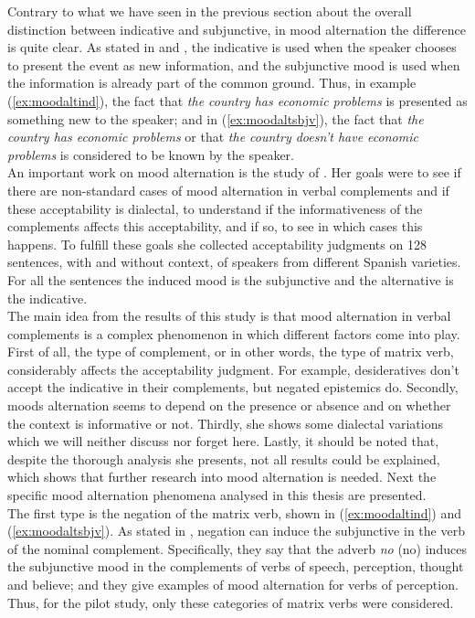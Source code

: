 Contrary to what we have seen in the previous section about the overall distinction between indicative and subjunctive, in mood alternation the difference is quite clear. As stated in \citet{mejias1998pragmatic,espanola2010nueva} and \citet{falk2017towards}, the indicative is used when the speaker chooses to present the event as new information, and the subjunctive mood is used when the information is already part of the common ground. Thus, in example (\ref{ex:moodaltind}), the fact that \textit{the country has economic problems} is presented as something new to the speaker; and in (\ref{ex:moodaltsbjv}), the fact that \textit{the country has economic problems} or that \textit{the country doesn't have economic problems} is considered to be known by the speaker.\\

An important work on mood alternation is the study of \citet{faulkner2021systematic}. Her goals were to see if there are non-standard cases of mood alternation in verbal complements and if these acceptability is dialectal, to understand if the informativeness of the complements affects this acceptability, and if so, to see in which cases this happens. To fulfill these goals she collected acceptability judgments on 128 sentences, with and without context, of speakers from different Spanish varieties. For all the sentences the induced mood is the subjunctive and the alternative is the indicative.\\

The main idea from the results of this study is that mood alternation in verbal complements is a complex phenomenon in which different factors come into play. First of all, the type of complement, or in other words, the type of matrix verb, considerably affects the acceptability judgment. For example, desideratives don't accept the indicative in their complements, but negated epistemics do. Secondly, moods alternation seems to depend on the presence or absence and on whether the context is informative or not. Thirdly, she shows some dialectal variations which we will neither discuss nor forget here. Lastly, it should be noted that, despite the thorough analysis she presents, not all results could be explained, which shows that further research into mood alternation is needed. Next the specific mood alternation phenomena analysed in this thesis are presented.\\

The first type is the negation of the matrix verb, shown in (\ref{ex:moodaltind}) and (\ref{ex:moodaltsbjv}). As stated in \citet{espanola2010nueva}, negation can induce the subjunctive in the verb of the nominal complement. Specifically, they say that the adverb \textit{no} (no) induces the subjunctive mood in the complements of verbs of speech, perception, thought and believe; and they give examples of mood alternation for verbs of perception. Thus, for the pilot study, only these categories of matrix verbs were considered.\\ 

